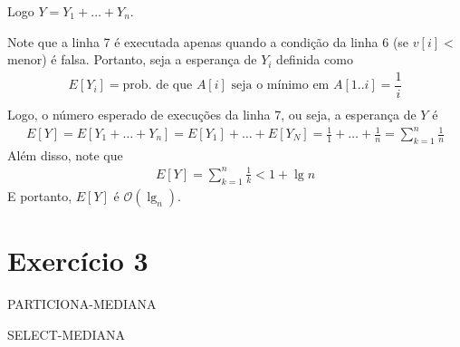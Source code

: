 \documentclass{article}
\newcommand{\bigO}[1]{\ensuremath{\mathcal{O}(#1)}}
\begin{document}
Logo $Y = Y_1 + \dots + Y_n$.

Note que a linha 7 é executada apenas quando a condição da linha 6 (se $v[i] <$ menor) é falsa.
Portanto, seja a esperança de $Y_i$ definida como
\begin{align*}
  E[Y_i] = \mbox{prob. de que } A[i] \mbox{ seja o mínimo em } A[1..i] = \dfrac{1}{i} \\
\end{align*}
Logo, o número esperado de execuções da linha 7, ou seja, a esperança de $Y$ é
\begin{align*}
  E[Y] = E[Y_1 + \dots + Y_n] = E[Y_1] + \dots + E[Y_N] = \frac{1}{1} + \dots + \frac{1}{n} = \sum_{k=1}^{n} \frac{1}{n}
\end{align*}
Além disso, note que
\begin{align*}
  E[Y] = \sum_{k=1}^{n} \frac{1}{k} < 1 + \lg n
\end{align*}
E portanto, $E[Y]$ é $\bigO{\lg_n}$.

\newpage

\section*{Exercício 3}

\begin{algorithm}
  \DontPrintSemicolon
  \caption{PARTICIONA-MEDIANA}
\end{algorithm}

\begin{algorithm}
  \DontPrintSemicolon
  \caption{SELECT-MEDIANA}
\end{algorithm}

\end{document}
